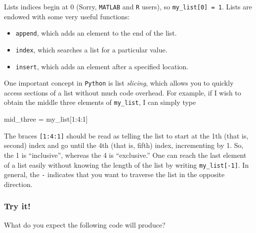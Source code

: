 \documentclass{article}
\newenvironment{Shaded}{}{}
\newcommand{\DecValTok}[1]{\textcolor[rgb]{0.25,0.63,0.44}{{#1}}}
\newcommand{\NormalTok}[1]{{#1}}
\begin{document}
Lists indices begin at 0 (Sorry, \texttt{MATLAB} and \texttt{R} users),
so \texttt{my\_list{[}0{]} = 1}. Lists are endowed with some very useful
functions:

\begin{itemize}
\itemsep1pt\parskip0pt
\item
  \texttt{append}, which adds an element to the end of the list.
\item
  \texttt{index}, which searches a list for a particular value.
\item
  \texttt{insert}, which adds an element after a specified location.
\end{itemize}

One important concept in \texttt{Python} is list \emph{slicing}, which
allows you to quickly access sections of a list without much code
overhead. For example, if I wish to obtain the middle three elements of
\texttt{my\_list}, I can simply type

\begin{Shaded}
\begin{Highlighting}[]
\NormalTok{mid_three = my_list[}\DecValTok{1}\NormalTok{:}\DecValTok{4}\NormalTok{:}\DecValTok{1}\NormalTok{]}
\end{Highlighting}
\end{Shaded}

The braces \texttt{{[}1:4:1{]}} should be read as telling the list to
start at the 1th (that is, second) index and go until the 4th (that is,
fifth) index, incrementing by 1. So, the 1 is ``inclusive'', whereas the
4 is ``exclusive.'' One can reach the last element of a list easily
without knowing the length of the list by writing
\texttt{my\_list{[}-1{]}}. In general, the \texttt{-} indicates that you
want to traverse the list in the opposite direction.

\subsubsection{Try it!}\label{try-it}

What do you expect the following code will produce?
\end{document}
